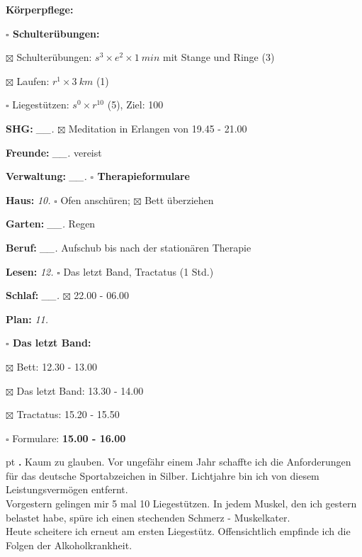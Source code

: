 \documentclass[10pt,a4paper]{article}
\newcounter{notec}
\newcommand\notep[1]{%
  \stepcounter{notec}
  \vskip #1pt
  {\bf\arabic{notec}.}
}
\newcommand\prop[1] {{\color {alizarin} {\bf #1}}}        %
\newcommand\draf[1] {{\color {amber(sae/ece)} {\bf #1}}}  %
\newcommand\mand[1] {{\color {burntorange} {\bf #1}}}     %
\newcommand\topvskip {\vskip 8pt}
\newcommand\topspace{\vskip -15pt \hskip 20pt}
\newcommand\bottomspace{\vskip 4pt}
\newcommand\n[1] { {\sl #1.} \hskip 5pt }
\begin{document}
\begin{mdframed}[style=daystyle]
\begin{labeling}{{\mand {Körperpflege:}}}
\begin{minipage}{0.75\textwidth}
\begin{labeling}{\prop {$\square$ {Schulterübungen:}}}
      \item[$\boxtimes$ Schulterübungen:] $s^3 \times e^2 \times 1\ min$ mit Stange und Ringe (3)
      \item[$\boxtimes$ Laufen:]          $r^1 \times 3\ km$ (1)
      \item[$\square$ Liegestützen:]    $s^0 \times r^{10}$ (5), Ziel: 100
      \end{labeling}
    \end{minipage}
    \bottomspace        
  \item[{\mand {SHG:}}]          \n{\_\_} $\boxtimes$ Meditation in Erlangen von 19.45 - 21.00
  \item[{\mand {Freunde:}}]      \n{\_\_} vereist
  \item[{\mand {Verwaltung:}}]   \n{\_\_} {\prop {$\square$ Therapieformulare}}
  \item[{\mand {Haus:}}]           \n{10} $\square$ Ofen anschüren; $\boxtimes$ Bett überziehen
  \item[{\mand {Garten:}}]       \n{\_\_} Regen
  \item[{\mand {Beruf:}}]        \n{\_\_} Aufschub bis nach der stationären Therapie
  \item[{\mand {Lesen:}}]          \n{12} $\square$ Das letzt Band, Tractatus (1 Std.)
  \item[{\mand {Schlaf:}}]       \n{\_\_} $\boxtimes$ 22.00 - 06.00
  \item[{\mand {Plan:}}]           \n{11}
    \topspace
    \begin{minipage}{0.75\textwidth}  
      \begin{labeling}{\prop {$\square$ {Das letzt Band:}}} 
        \setlength\itemsep{-3pt}
      \item[$\boxtimes$ Bett:]           12.30 - 13.00
      \item[$\boxtimes$ Das letzt Band:] 13.30 - 14.00
      \item[$\boxtimes$ Tractatus:]      15.20 - 15.50
      \item[$\square$   Formulare:]      {\draf {15.00 - 16.00}}
      \end{labeling}
    \end{minipage}
    \bottomspace        
  \end{labeling}

  \topvskip

  \setcounter{notec}{0}

  \notep 0 Kaum zu glauben. Vor ungefähr einem Jahr schaffte ich die Anforderungen für
  das deutsche Sportabzeichen in Silber. Lichtjahre bin ich von diesem
  Leistungsvermögen entfernt. \\
  Vorgestern gelingen mir 5 mal 10 Liegestützen. In jedem Muskel, den ich
  gestern belastet habe, spüre ich einen stechenden Schmerz - Muskelkater. \\
  Heute scheitere ich erneut am ersten Liegestütz. Offensichtlich empfinde ich
  die Folgen der Alkoholkrankheit.


\end{mdframed}
\end{document}
